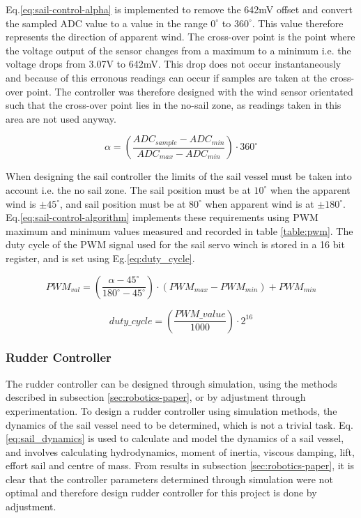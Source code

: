 Eq.\ref{eq:sail-control-alpha} is implemented to remove the 642mV offset and convert the sampled ADC value to a value in the range $0^{\circ}$ to $360^{\circ}$. This value therefore represents the
direction of apparent wind. The cross-over point is the point where the voltage output of the sensor changes from a maximum to a minimum i.e. the voltage drops from 3.07V to 642mV. This drop does 
not occur instantaneously and because of this erronous readings can occur if samples are taken at the cross-over point. The controller was therefore designed with the wind sensor orientated such that 
the cross-over point lies in the no-sail zone, as readings taken in this area are not used anyway.


\begin{equation}
    \label{eq:sail-control-alpha}
    \alpha = \left( \frac{ADC_{sample} - ADC_{min}}{ADC_{max} - ADC_{min}} \right) \cdot 360^{\circ}
\end{equation}


When designing the sail controller the limits of the sail vessel must be taken into account i.e. the no sail zone. The sail position must be at $10^{\circ}$ when the apparent wind is $\pm 45^{\circ}$,
and sail position must be at $80^{\circ}$ when apparent wind is at $\pm 180^{\circ}$. Eq.\ref{eq:sail-control-algorithm} implements these requirements using PWM maximum and minimum values measured and recorded in table
\ref{table:pwm}. The duty cycle of the PWM signal used for the sail servo winch is stored in a 16 bit register, and is set using Eg.\ref{eq:duty_cycle}.

\begin{equation}
    \label{eq:sail-control-algorithm}
    PWM_{val} = \left( \frac{\alpha - 45^{\circ}}{180^{\circ} - 45^{\circ}} \right) \cdot \left( PWM_{max} - PWM_{min}\right) + PWM_{min}
\end{equation}

\begin{equation}
    \label{eq:duty_cycle}
    duty\_cycle = \left(\frac{PWM\_value}{1000}\right) \cdot 2^{16}
\end{equation}


\subsubsection{Rudder Controller}
The rudder controller can be designed through simulation, using the methods described in subsection \ref{sec:robotics-paper}, or by adjustment through experimentation. To design a rudder 
controller using simulation methods, the dynamics of the sail vessel need to be determined, which is not a trivial task. Eq.\ref{eq:sail_dynamics} is used to calculate and model the dynamics 
of a sail vessel, and involves calculating hydrodynamics, moment of inertia, viscous damping, lift, effort sail and centre of mass. From results in subsection \ref{sec:robotics-paper}, 
it is clear that the controller parameters determined through simulation were not optimal and therefore design rudder controller for this project is done by adjustment.

